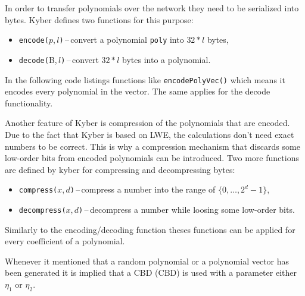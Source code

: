 In order to transfer polynomials over the network they need to be serialized into bytes. Kyber defines two functions for this purpose:
\begin{itemize}
  \item \texttt{encode(}$p$,\,$l$\texttt{)}\,--\,convert a polynomial \texttt{poly} into $32*l$ bytes,
  \item \texttt{decode(}B,\,$l$\texttt{)}\,--\,convert $32*l$ bytes into a polynomial.
\end{itemize}
In the following code listings functions like \texttt{encodePolyVec()} which means it encodes every polynomial in the vector. The same applies for the decode functionality.

Another feature of Kyber is compression of the polynomials that are encoded. Due to the fact that Kyber is based on LWE, the calculations don't need exact numbers to be correct. This is why a compression mechanism that discards some low-order bits from encoded polynomials can be introduced. Two more functions are defined by kyber for compressing and decompressing bytes:
\begin{itemize}
  \item \texttt{compress(}$x$,\,$d$\texttt{)}\,--\,compress a number into the range of $\{0,\dots,2^d-1\}$,
  \item \texttt{decompress(}$x$,\,$d$\texttt{)}\,--\,decompress a number while loosing some low-order bits.
\end{itemize}
Similarly to the encoding/decoding function theses functions can be applied for every coefficient of a polynomial.

Whenever it mentioned that a random polynomial or a polynomial vector has been generated it is implied that a CBD (\acl{CBD}) is used with a parameter either $\eta_1$ or $\eta_2$.